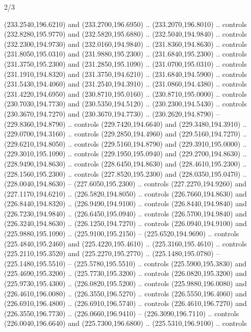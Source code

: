 \begin{flagdescription}{2/3}
\begin{scope}[xshift=0.5\flaglength,yshift=0.5\flagwidth,scale=\flagwidth/259.2]
\begin{scope}[y=0.8pt, x=0.8pt, yscale=-1,shift={(-243,-162)}]
      (233.2540,196.6210) and (233.2700,196.6950) .. (233.2070,196.8010) .. controls
      (232.8280,195.9770) and (232.5820,195.6880) .. (232.5040,194.9840) .. controls
      (232.2300,194.9730) and (232.0160,194.9840) .. (231.8360,194.8630) .. controls
      (231.8050,195.0310) and (231.9880,195.2300) .. (231.6840,195.2300) .. controls
      (231.3750,195.2300) and (231.2850,195.1090) .. (231.0700,195.0310) .. controls
      (231.1910,194.8320) and (231.3750,194.6210) .. (231.6840,194.5900) .. controls
      (231.5430,194.4060) and (231.2540,194.3910) .. (231.0860,194.4380) .. controls
      (231.4220,194.6950) and (230.8710,195.0160) .. (230.8710,195.0000) .. controls
      (230.7030,194.7730) and (230.5350,194.5120) .. (230.2300,194.5430) .. controls
      (230.3670,194.7270) and (230.3670,194.7730) .. (230.2620,194.8790) --
      (229.8360,194.8790) .. controls (229.7420,194.6640) and (229.3480,194.3910) ..
      (229.0700,194.3160) .. controls (229.2850,194.4960) and (229.5160,194.7270) ..
      (229.6210,194.8050) .. controls (229.5160,194.8790) and (229.3910,195.0000) ..
      (229.3010,195.1090) .. controls (229.1950,195.0940) and (229.2700,194.8630) ..
      (228.9490,194.8630) .. controls (228.6450,194.8630) and (228.4610,195.2300) ..
      (228.1560,195.2300) .. controls (227.8520,195.2300) and (228.0350,195.0470) ..
      (228.0040,194.8630) -- (227.6050,195.2300) .. controls (227.2270,194.9260) and
      (227.1170,194.6210) .. (226.5820,194.8050) .. controls (226.7660,194.8630) and
      (226.8440,194.8320) .. (226.9490,194.9100) .. controls (226.8440,194.9840) and
      (226.7230,194.9840) .. (226.6450,195.0940) .. controls (226.5700,194.9840) and
      (226.3240,194.8630) .. (226.1250,194.7270) .. controls (226.0940,194.9100) and
      (225.9880,195.1090) .. (225.9100,195.2150) -- (225.6520,194.9690) .. controls
      (225.4840,195.2460) and (225.4220,195.4610) .. (225.3160,195.4610) .. controls
      (225.2110,195.3520) and (225.2270,195.2770) .. (225.1480,195.0780) --
      (225.1480,195.5510) -- (225.5780,195.5510) .. controls (225.5900,195.3830) and
      (225.4690,195.3200) .. (225.7730,195.3200) .. controls (226.0820,195.3200) and
      (225.9730,195.4300) .. (226.0820,195.5200) .. controls (225.9880,196.0080) and
      (226.4610,196.0080) .. (226.3550,196.5270) .. controls (226.5550,196.4060) and
      (226.6910,196.4800) .. (226.6910,196.5740) .. controls (226.4610,196.7270) and
      (226.3550,196.7730) .. (226.0660,196.9410) -- (226.3090,196.7110) .. controls
      (226.0040,196.6640) and (225.7300,196.6800) .. (225.5310,196.9100) .. controls

\end{scope}
\end{scope}
\end{flagdescription}

